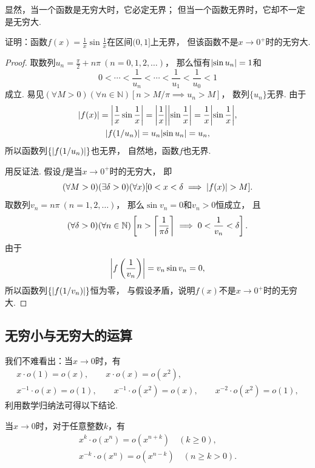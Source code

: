 显然，当一个函数是无穷大时，它必定无界；
但当一个函数无界时，它却不一定是无穷大.
\begin{example}
证明：函数\(f(x) = \frac1x \sin\frac1x\)在区间\((0,1]\)上无界，
但该函数不是\(x\to0^+\)时的无穷大.
\begin{proof}
取数列\(u_n = \frac{\pi}{2} + n\pi\ (n=0,1,2,\dotsc)\)，
那么恒有\(\abs{\sin u_n} = 1\)和\begin{equation*}
	0 < \dotsb < \frac1{u_n} < \dotsb < \frac1{u_1} < \frac1{u_0} < 1
\end{equation*}成立.
易见\((\forall M > 0)(\forall n\in\mathbb{N})[n > M/\pi \implies u_n > M]\)，
数列\(\{u_n\}\)无界.
由于\begin{gather*}
	\abs{f(x)} = \abs{\frac1x \sin\frac1x}
	= \abs{\frac1x} \abs{\sin\frac1x}
	= \frac1x \abs{\sin\frac1x}, \\
	\abs{f(1/u_n)}
	= u_n \abs{\sin u_n}
	= u_n,
\end{gather*}
所以函数列\(\{\abs{f(1/u_n)}\}\)也无界，
自然地，函数\(f\)也无界.

用反证法.
假设\(f\)是当\(x\to0^+\)时的无穷大，
即\begin{equation*}
	(\forall M>0)
	(\exists\delta>0)
	(\forall x)
	[
		0<x<\delta
		\implies
		\abs{f(x)}>M
	].
\end{equation*}
取数列\(v_n = n\pi\ (n=1,2,\dotsc)\)，
那么\(\sin v_n = 0\)和\(v_n>0\)恒成立，
且\begin{equation*}
	(\forall\delta>0)
	(\forall n\in\mathbb{N})
	\left[n>\ceil*{\frac1{\pi\delta}} \implies 0<\frac1{v_n}<\delta\right].
\end{equation*}
由于\begin{equation*}
	\abs{f\left(\frac1{v_n}\right)}
	= v_n \sin v_n
	= 0,
\end{equation*}
所以函数列\(\{\abs{f(1/v_n)}\}\)恒为零，
与假设矛盾，说明\(f(x)\)不是\(x\to0^+\)时的无穷大.
\end{proof}
\end{example}

\subsection{无穷小与无穷大的运算}
我们不难看出：当\(x\to0\)时，有\begin{gather*}
	x \cdot o(1) = o(x), \qquad
	x \cdot o(x) = o(x^2), \\
	x^{-1} \cdot o(x) = o(1), \qquad
	x^{-1} \cdot o(x^2) = o(x), \qquad
	x^{-2} \cdot o(x^2) = o(1),
\end{gather*}
利用数学归纳法可得以下结论.
\begin{proposition}
当\(x\to0\)时，对于任意整数\(k\)，有\begin{gather}
	x^k \cdot o(x^n) = o(x^{n+k})
	\quad(k \geq 0), \\
	x^{-k} \cdot o(x^n) = o(x^{n-k})
	\quad(n \geq k > 0).
\end{gather}
\end{proposition}

